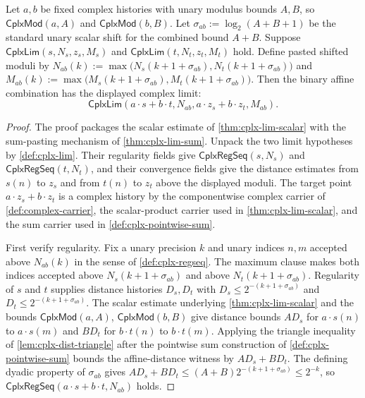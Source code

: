 \begin{theorem}
\label{thm:cplx-lim-binary-affine-combination}
Let $a,b$ be fixed complex histories with unary modulus bounds $A,B$, so $\mathsf{CplxMod}(a,A)$ and $\mathsf{CplxMod}(b,B)$. Let $\sigma_{ab}:=\log_2(A+B+1)$ be the standard unary scalar shift for the combined bound $A+B$. Suppose $\mathsf{CplxLim}(s,N_s,z_s,M_s)$ and $\mathsf{CplxLim}(t,N_t,z_t,M_t)$ hold. Define pasted shifted moduli by $N_{ab}(k):=\max\bigl(N_s(k+1+\sigma_{ab}),N_t(k+1+\sigma_{ab})\bigr)$ and $M_{ab}(k):=\max\bigl(M_s(k+1+\sigma_{ab}),M_t(k+1+\sigma_{ab})\bigr)$. Then the binary affine combination has the displayed complex limit:
$$
\mathsf{CplxLim}(a\cdot s+b\cdot t,N_{ab},a\cdot z_s+b\cdot z_t,M_{ab}).
$$
\end{theorem}
\begin{proof}
The proof packages the scalar estimate of \autoref{thm:cplx-lim-scalar} with the sum-pasting mechanism of \autoref{thm:cplx-lim-sum}. Unpack the two limit hypotheses by \autoref{def:cplx-lim}. Their regularity fields give $\mathsf{CplxRegSeq}(s,N_s)$ and $\mathsf{CplxRegSeq}(t,N_t)$, and their convergence fields give the distance estimates from $s(n)$ to $z_s$ and from $t(n)$ to $z_t$ above the displayed moduli. The target point $a\cdot z_s+b\cdot z_t$ is a complex history by the componentwise complex carrier of \autoref{def:complex-carrier}, the scalar-product carrier used in \autoref{thm:cplx-lim-scalar}, and the sum carrier used in \autoref{def:cplx-pointwise-sum}.

First verify regularity. Fix a unary precision $k$ and unary indices $n,m$ accepted above $N_{ab}(k)$ in the sense of \autoref{def:cplx-regseq}. The maximum clause makes both indices accepted above $N_s(k+1+\sigma_{ab})$ and above $N_t(k+1+\sigma_{ab})$. Regularity of $s$ and $t$ supplies distance histories $D_s,D_t$ with $D_s\leq 2^{-(k+1+\sigma_{ab})}$ and $D_t\leq 2^{-(k+1+\sigma_{ab})}$. The scalar estimate underlying \autoref{thm:cplx-lim-scalar} and the bounds $\mathsf{CplxMod}(a,A)$, $\mathsf{CplxMod}(b,B)$ give distance bounds $A D_s$ for $a\cdot s(n)$ to $a\cdot s(m)$ and $B D_t$ for $b\cdot t(n)$ to $b\cdot t(m)$. Applying the triangle inequality of \autoref{lem:cplx-dist-triangle} after the pointwise sum construction of \autoref{def:cplx-pointwise-sum} bounds the affine-distance witness by $A D_s+B D_t$. The defining dyadic property of $\sigma_{ab}$ gives $A D_s+B D_t\leq (A+B)2^{-(k+1+\sigma_{ab})}\leq 2^{-k}$, so $\mathsf{CplxRegSeq}(a\cdot s+b\cdot t,N_{ab})$ holds.


\end{proof}
